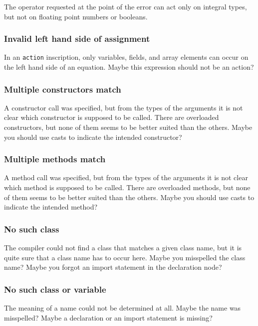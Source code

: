 The operator requested at the point of the error
can act only on integral types, but not on
floating point numbers or booleans.

\subsubsection{Invalid left hand side of assignment}

In an \texttt{action} inscription, only variables, fields,
and array elements can occur on the left hand side of an equation.
Maybe this expression should not be an action?

\subsubsection{Multiple constructors match}

A constructor call was specified, but from the types of the
arguments it is not clear which constructor
is supposed to be called.
There are overloaded constructors, but none of
them seems to be better suited than the others.
Maybe you should use casts to indicate the intended constructor?

\subsubsection{Multiple methods match}

A method call was specified, but from the types of the
arguments it is not clear which method
is supposed to be called.
There are overloaded methods, but none of
them seems to be better suited than the others.
Maybe you should use casts to indicate the intended method?

\subsubsection{No such class}

The compiler could not find a class that matches a given class
name, but it is quite sure that a class name has to occur here.
Maybe you misspelled the class name? Maybe you forgot an import
statement in the declaration node?

\subsubsection{No such class or variable}

The meaning of a name could not be determined at all.
Maybe the name was misspelled?
Maybe a declaration or an import statement is missing?

